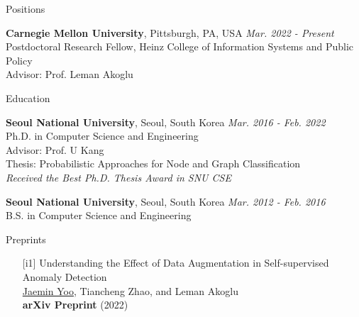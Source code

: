 \documentclass{resume} %
\begin{document}

\begin{rSection}{Positions}

\textbf{Carnegie Mellon University}, Pittsburgh, PA, USA \hfill \emph{Mar. 2022 - Present} \\ 
Postdoctoral Research Fellow, Heinz College of Information Systems and Public Policy \\
Advisor: Prof. Leman Akoglu

\end{rSection}


\begin{rSection}{Education}

\textbf{Seoul National University}, Seoul, South Korea \hfill \emph{Mar. 2016 - Feb. 2022} \\ 
Ph.D. in Computer Science and Engineering \\
Advisor: Prof. U Kang \\
Thesis: Probabilistic Approaches for Node and Graph Classification \\
\emph{Received the Best Ph.D. Thesis Award in SNU CSE}

\textbf{Seoul National University}, Seoul, South Korea \hfill \emph{Mar. 2012 - Feb. 2016} \\ 
B.S. in Computer Science and Engineering

\end{rSection}


\begin{rSection}{Preprints}
\smallskip
\begin{enumerate}

	\item[{[i1]}]
		Understanding the Effect of Data Augmentation in Self-supervised Anomaly Detection \\
		\underline{Jaemin Yoo}, Tiancheng Zhao, and Leman Akoglu \\
		\textbf{arXiv Preprint} (2022) \\

\end{enumerate}
\end{rSection}
\end{document}
